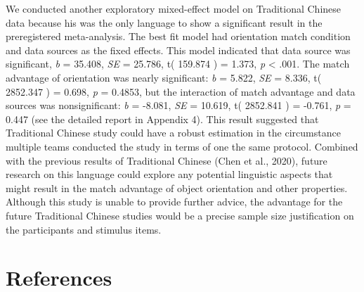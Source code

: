 \documentclass[
  man]{apa6}
\begin{document}
We conducted another exploratory mixed-effect model on Traditional Chinese data because his was the only language to show a significant result in the preregistered meta-analysis. The best fit model had orientation match condition and data sources as the fixed effects. This model indicated that data source was significant, \emph{b} = 35.408, \emph{SE} = 25.786, t( 159.874 ) = 1.373, \emph{p} \textless{} .001. The match advantage of orientation was nearly significant: \emph{b} = 5.822, \emph{SE} = 8.336, t( 2852.347 ) = 0.698, \emph{p} = 0.4853, but the interaction of match advantage and data sources was nonsignificant: \emph{b} = -8.081, \emph{SE} = 10.619, t( 2852.841 ) = -0.761, \emph{p} = 0.447 (see the detailed report in Appendix 4). This result suggested that Traditional Chinese study could have a robust estimation in the circumstance multiple teams conducted the study in terms of one the same protocol. Combined with the previous results of Traditional Chinese (Chen et al., 2020), future research on this language could explore any potential linguistic aspects that might result in the match advantage of object orientation and other properties. Although this study is unable to provide further advice, the advantage for the future Traditional Chinese studies would be a precise sample size justification on the participants and stimulus items.

\newpage

\hypertarget{references}{%
\section{References}\label{references}}

\begingroup
\setlength{\parindent}{-0.5in}
\setlength{\leftskip}{0.5in}
\end{document}
